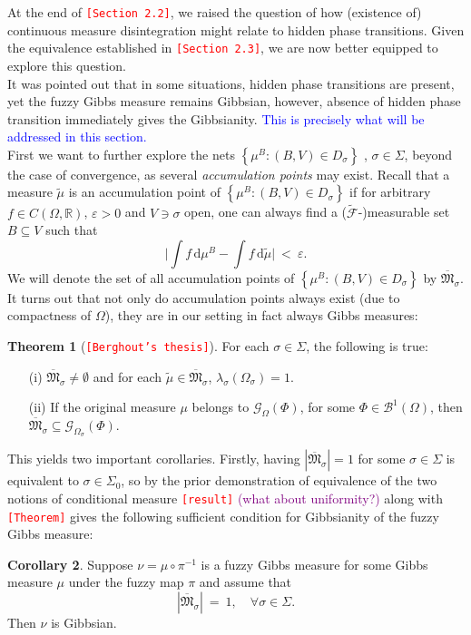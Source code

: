 \documentclass[12pt]{article}
\newcommand{\BB}{\mathscr{B}}
\renewcommand{\d}{\mathrm{d}}
\newcommand{\F}{\mathcal{F}}
\newcommand{\G}{\mathcal{G}}
\newcommand{\MM}{\mathfrak{M}}
\newcommand{\R}{\mathbb{R}}
\newcommand{\set}[1]{\left\{#1\right\}}
\newcommand{\1}{\mathbbm{1}}
\newcommand{\5}{\vspace{0.5cm}}
\renewcommand{\tilde}{\widetilde}
\theoremstyle{definition}
\newtheorem{thm}{Theorem}[section]
\newtheorem{cor}[thm]{Corollary}
\begin{document}
At the end of \textcolor{red}{\texttt{[Section 2.2]}}, we raised the question of how (existence of) continuous measure disintegration might relate to hidden phase transitions. Given the equivalence established in \textcolor{red}{\texttt{[Section 2.3]}}, we are now better equipped to explore this question. \\

It was pointed out that in some situations, hidden phase transitions are present, yet the fuzzy Gibbs measure remains Gibbsian, however, absence of hidden phase transition immediately gives the Gibbsianity. \textcolor{blue}{This is precisely what will be addressed in this section.} \\

First we want to further explore the nets $\set{\mu^B:(B,V)\in D_\sigma}$ , $\sigma\in\Sigma$, beyond the case of convergence, as several \textit{accumulation points} may exist. Recall that a measure $\tilde{\mu}$ is an accumulation point of $\set{\mu^B:(B,V)\in D_\sigma}$ if for arbitrary $f\in C(\Omega,\R)$, $\varepsilon>0$ and $V\ni \sigma$ open, one can always find a ($\tilde{\F}$-)measurable set $B\subseteq V$ such that 
$$\Big|\int f\,\d\mu^B - \int f\,\d\tilde{\mu}\Big| ~<~ \varepsilon.$$
We will denote the set of all accumulation points of $\set{\mu^B:(B,V)\in D_\sigma}$ by $\overline{\MM}_\sigma$. It turns out that not only do accumulation points always exist (due to compactness of $\Omega$), they are in our setting in fact always Gibbs measures:
\begin{thm}[\textcolor{red}{\texttt{[Berghout's thesis]}}]
For each $\sigma\in\Sigma$, the following is true:
\begin{itemize}
	\item[(i)] $\overline{\MM}_\sigma\neq \emptyset$ and for each $\tilde{\mu}\in\overline{\MM}_\sigma$, $\lambda_\sigma(\Omega_\sigma)=1$.
	\item[(ii)] If the original measure $\mu$ belongs to $\G_\Omega(\Phi)$, for some $\Phi\in\BB^1(\Omega)$, then $\overline{\MM}_\sigma\subseteq\G_{\Omega_\sigma}(\Phi)$.
\end{itemize}
\end{thm} 

This yields two important corollaries. Firstly, having $|\overline{\MM}_\sigma|=1$ for some $\sigma\in\Sigma$ is equivalent to $\sigma\in\Sigma_0$, so by the prior demonstration of equivalence of the two notions of conditional measure \textcolor{red}{\texttt{[result]}} \textcolor{purple}{(what about uniformity?)} along with \textcolor{red}{\texttt{[Theorem]}} gives the following sufficient condition for Gibbsianity of the fuzzy Gibbs measure:
\begin{cor}
Suppose $\nu=\mu\circ\pi^{-1}$ is a fuzzy Gibbs measure for some Gibbs measure $\mu$ under the fuzzy map $\pi$ and assume that 
$$|\overline{\MM}_\sigma| ~=~ 1, \quad \forall \sigma\in\Sigma.$$
Then $\nu$ is Gibbsian.
\end{cor}
\end{document}
